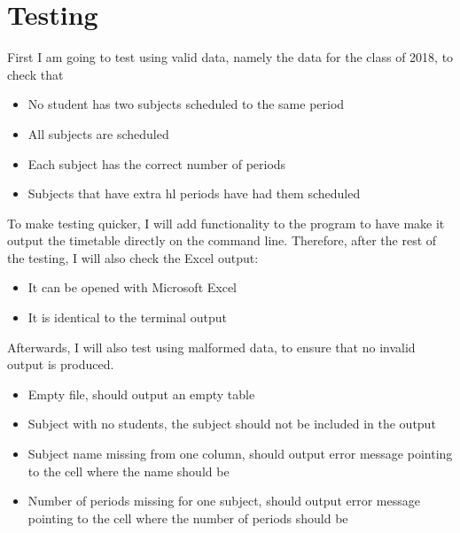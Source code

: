 \documentclass[12pt]{article}
\begin{document}
\section*{Testing}

First I am going to test using valid data, namely the data for the class of 2018, to check
that
%
\begin{itemize}
    \item No student has two subjects scheduled to the same period
    \item All subjects are scheduled
    \item Each subject has the correct number of periods
    \item Subjects that have extra hl periods have had them scheduled
\end{itemize}
%

To make testing quicker, I will add functionality to the program to have make it output the
timetable directly on the command line. Therefore, after the rest of the testing, I will
also check the Excel output:
%
\begin{itemize}
    \item It can be opened with Microsoft Excel
    \item It is identical to the terminal output
\end{itemize}
%

Afterwards, I will also test using malformed data, to ensure that no invalid output is
produced. 
%
\begin{itemize}
    \item Empty file, should output an empty table
    \item Subject with no students, the subject should not be included in the output
    \item Subject name missing from one column, should output error message pointing to the
        cell where the name should be
    \item Number of periods missing for one subject, should output error message pointing to
        the cell where the number of periods should be
\end{itemize}
%
\end{document}

